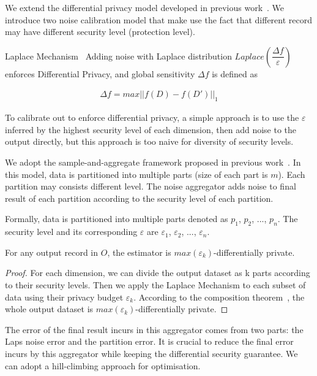 We extend the differential privacy model developed in previous
work~\cite{differentialdp:stoc11}. We introduce two noise calibration model
that make use the fact that different record may have
different security level (protection level).


\begin{theorem}{Laplace Mechanism~\cite{laplace}}
  Adding noise with Laplace distribution $Laplace(\dfrac{\Delta 
f}{\varepsilon})$ enforces
  Differential Privacy, and global sensitivity $\Delta f$ is defined as

  \begin{align}
    \Delta f = max || f(D) - f(D') ||_1
  \end{align}

\end{theorem}

To calibrate out to enforce differential privacy,
a simple approach is to use the $\varepsilon$ inferred by the highest security
level of each dimension, then add noise to the output directly, but this 
approach
is too naive for diversity of security levels.

We adopt the sample-and-aggregate framework proposed in previous 
work~\cite{differentialdp:stoc11}.
In this model, data is partitioned into multiple parts (size of each part is 
$m$).
Each partition may consists
different level. The noise aggregator adds noise to final result of each 
partition
according to the security level of each partition.

Formally, data is partitioned into multiple parts denoted as $p_1$, $p_2$, ..., 
$p_n$.
The security level and its corresponding $\varepsilon$ are $\varepsilon_1$,
$\varepsilon_2$, ..., $\varepsilon_n$.

\begin{theorem}
  For any output record in $O$, the
  estimator is $max(\varepsilon_k)$-differentially private.
\end{theorem}
\begin{proof}
  For each dimension, we can divide the output dataset as k parts
  according to their security levels. Then we apply the Laplace Mechanism
  to each subset of data using their privacy budget $\varepsilon_k$. According
  to the composition theorem~\cite{dp:recommender:kdd09, dp:dwork:stoc09, 
dp:book17}, the whole output dataset
  is $max(\varepsilon_k)$-differentially private.
\end{proof}

The error of the final result incurs in this aggregator comes from two parts:
the Laps noise error and the partition error. It is crucial to reduce the final
error incurs by this aggregator while keeping the differential security 
guarantee. We can adopt a hill-climbing approach for optimisation.

